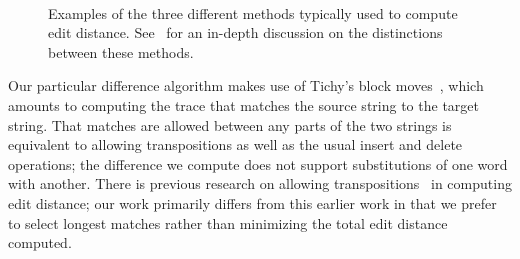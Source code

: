 \begin{figure}[htbp]
\centering
  \hspace{2ex}
  \\
\caption{
  Examples of the three different methods typically used to compute
  edit distance.  See~\cite{Sankoff1999} for an in-depth discussion
  on the distinctions between these methods.
  \label{fig:trace-alignment-listing}
}
\end{figure}

Our particular difference algorithm makes use of
Tichy's block moves~\cite{Tichy1984}, which amounts to computing
the trace that matches the source string to the target string.
That matches are allowed between any parts of the two strings
is equivalent to allowing transpositions as well as the usual
insert and delete operations; the difference we compute does not support
substitutions of one word with another.
There is previous research on allowing
transpositions~\cite{Lowrance1975,Wagner1975,Sankoff1999} in
computing edit distance; our work primarily differs from this
earlier work in that we prefer to select longest matches rather
than minimizing the total edit distance computed.

